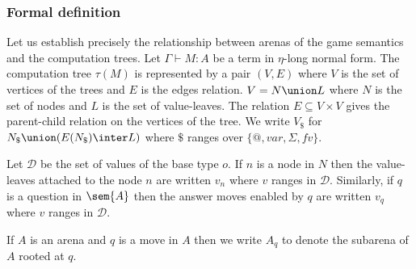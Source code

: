 \subsubsection{Formal definition}

Let us establish precisely the relationship between arenas of the
game semantics and the computation trees. Let $\Gamma \vdash M : A$
be a term in $\eta$-long normal form. The computation tree $\tau(M)$
is represented by a pair $(V,E)$ where $V$ is the set of vertices of
the trees and $E$ is the edges relation. $V = N \union L$ where $N$
is the set of nodes and $L$ is the set of value-leaves.
The relation $E \subseteq V \times V$ gives the parent-child relation on the vertices of the tree.
We write $V_\$$ for $N_\$ \union (E(N_\$) \inter L)$ where $\$$ ranges over $\{@, var, \Sigma, fv \}$.


Let $\mathcal{D}$ be the set of values of the base type $o$. If $n$ is a node in $N$ then the value-leaves attached to the node $n$ are written $v_n$ where $v$ ranges in $\mathcal{D}$.
Similarly, if $q$ is a question in $\sem{A}$ then the answer moves enabled by $q$ are written $v_q$ where $v$ ranges in $\mathcal{D}$.

If $A$ is an arena and $q$ is a move in $A$ then we write $A_q$ to
denote the subarena of $A$ rooted at $q$.

